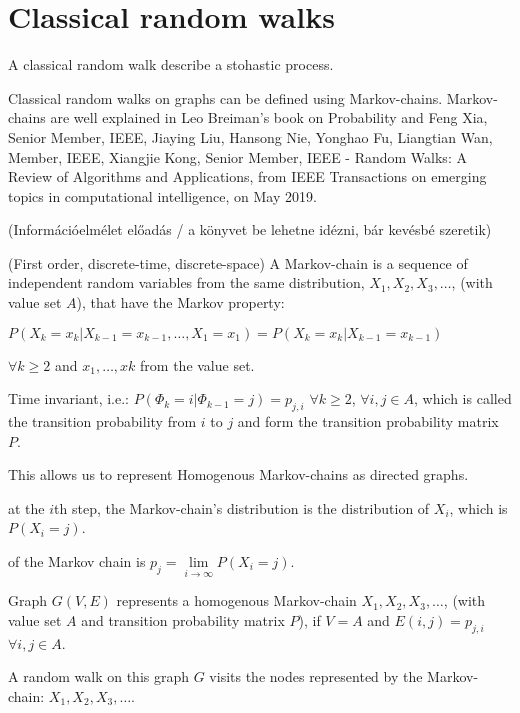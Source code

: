 \section{Classical random walks}

A classical random walk describe a stohastic process.


Classical random walks on graphs can be defined using Markov-chains. Markov-chains
are well explained in Leo Breiman's book on Probability\cite{breiman_probability_1992} and Feng Xia, Senior Member, IEEE, Jiaying Liu, Hansong Nie, Yonghao Fu, Liangtian Wan, Member, IEEE,
Xiangjie Kong, Senior Member, IEEE - Random Walks: A Review of Algorithms and Applications, from IEEE Transactions on emerging topics in computational intelligence, on May 2019.

(Információelmélet előadás / a könyvet be lehetne idézni, bár kevésbé szeretik)

 (First order, discrete-time, discrete-space) A Markov-chain is a sequence of independent random variables from the same distribution, $X_1, X_2, X_3, \dots$, (with value set $A$), that have the Markov property:


$P(X_k = x_k | X_{k-1} = x_{k-1}, \dots, X_1 = x_1) = P(X_k = x_k | X_{k-1} = x_{k-1})$

$\forall k\geq{}2$ and $x_{1},\dots, x{k}$ from the value set.

 Time invariant, i.e.:
$P(\Phi_k = i | \Phi_{k-1} = j) = p_{j,i}$ $\forall k\geq{}2$, $\forall i,j \in{} A$, which is called the transition probability from $i$ to $j$ and form the transition probability matrix $P$.

This allows us to represent Homogenous Markov-chains as directed graphs.

 at the $i$th step, the Markov-chain's distribution is the distribution of $X_i$, which is $P(X_i = j)$.

 of the Markov chain is $p_{j} = \lim\limits_{i \to \infty} P(X_i = j)$.

Graph $G(V,E)$ represents a homogenous Markov-chain $X_1, X_2, X_3, \dots$, (with value set $A$ and transition probability matrix $P$), if $V=A$ and $E(i,j) = p_{j,i}$ $\forall{}i,j\in{}A$.

A random walk on this graph $G$ visits the nodes represented by the Markov-chain: $X_1, X_2, X_3, \dots$.

